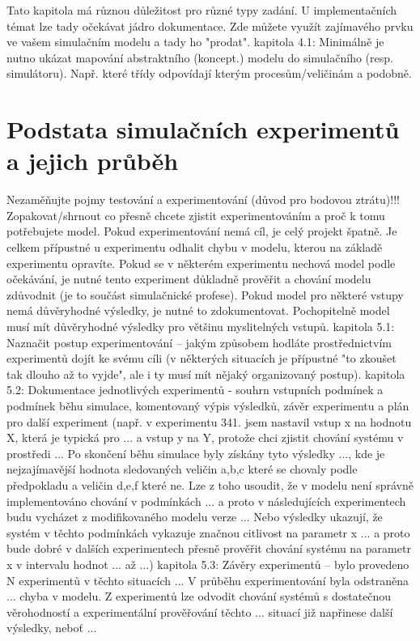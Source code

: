 \documentclass[a4paper,11pt]{article}
\begin{document}
Tato kapitola má různou důležitost pro různé typy zadání. U implementačních témat lze tady očekávat jádro dokumentace. Zde můžete využít zajímavého prvku ve vašem simulačním modelu a tady ho "prodat".
kapitola 4.1: Minimálně je nutno ukázat mapování abstraktního (koncept.) modelu do simulačního (resp. simulátoru). Např. které třídy odpovídají kterým procesům/veličinám a podobně.



\section{Podstata simulačních experimentů a jejich průběh}

Nezaměňujte pojmy testování a experimentování (důvod pro bodovou ztrátu)!!!
Zopakovat/shrnout co přesně chcete zjistit experimentováním a proč k tomu potřebujete model. Pokud experimentování nemá cíl, je celý projekt špatně. Je celkem přípustné u experimentu odhalit chybu v modelu, kterou na základě experimentu opravíte. Pokud se v některém experimentu nechová model podle očekávání, je nutné tento experiment důkladně prověřit a chování modelu zdůvodnit (je to součást simulačnické profese). Pokud model pro některé vstupy nemá důvěryhodné výsledky, je nutné to zdokumentovat. Pochopitelně model musí mít důvěryhodné výsledky pro většinu myslitelných vstupů.
kapitola 5.1: Naznačit postup experimentování – jakým způsobem hodláte prostřednictvím experimentů dojít ke svému cíli (v některých situacích je přípustné "to zkoušet tak dlouho až to vyjde", ale i ty musí mít nějaký organizovaný postup).
kapitola 5.2: Dokumentace jednotlivých experimentů - souhrn vstupních podmínek a podmínek běhu simulace, komentovaný výpis výsledků, závěr experimentu a plán pro další experiment (např. v experimentu 341. jsem nastavil vstup x na hodnotu X, která je typická pro ... a vstup y na Y, protože chci zjistit chování systému v prostředi ... Po skončení běhu simulace byly získány tyto výsledky ..., kde je nejzajímavější hodnota sledovaných veličin a,b,c které se chovaly podle předpokladu a veličin d,e,f které ne. Lze z toho usoudit, že v modelu není správně implementováno chování v podmínkách ... a proto v následujících experimentech budu vycházet z modifikovaného modelu verze ... Nebo výsledky ukazují, že systém v těchto podmínkách vykazuje značnou citlivost na parametr x ... a proto bude dobré v dalších experimentech přesně prověřit chování systému na parametr x v intervalu hodnot ... až ...)
kapitola 5.3: Závěry experimentů – bylo provedeno N experimentů v těchto situacích ... V průběhu experimentování byla odstraněna ... chyba v modelu. Z experimentů lze odvodit chování systémů s dostatečnou věrohodností a experimentální prověřování těchto ... situací již napřinese další výsledky, neboť ...
\end{document}
